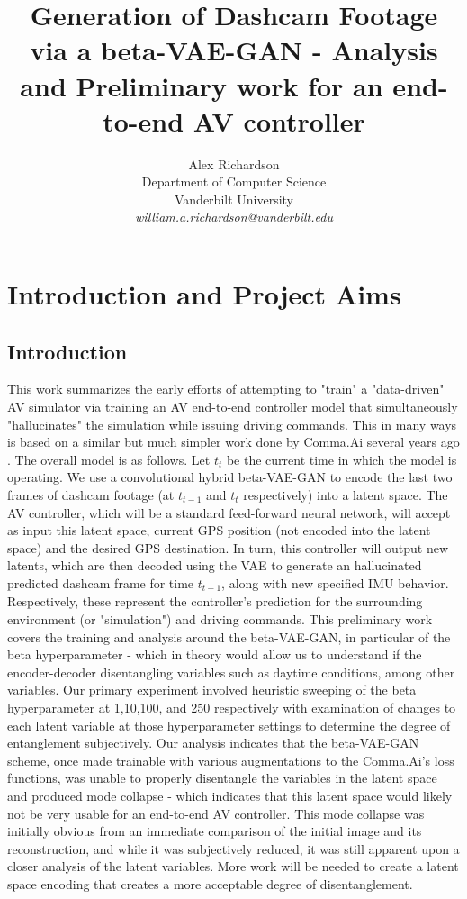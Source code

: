 \documentclass{article}
\title{Generation of Dashcam Footage via a beta-VAE-GAN - Analysis and Preliminary work for an end-to-end AV controller}
\author{
Alex Richardson \\
  Department of Computer Science\\
  Vanderbilt University\\
  \textit{william.a.richardson@vanderbilt.edu}
}
\begin{document}
\maketitle

\section{Introduction and Project Aims}
\subsection{Introduction}
 This work summarizes the early efforts of attempting to "train" a "data-driven" AV simulator via training an AV end-to-end controller model that simultaneously "hallucinates" the simulation while issuing driving commands. This in many ways is based on a similar but much simpler work done by Comma.Ai several years ago \cite{santana2016learning}. The overall model is as follows. Let $t_{t}$ be the current time in which the model is operating. We use a convolutional hybrid beta-VAE-GAN to encode the last two frames of dashcam footage (at $t_{t - 1}$ and $t_{t}$ respectively) into a latent space. The AV controller, which will be a standard feed-forward neural network, will accept as input this latent space, current GPS position (not encoded into the latent space) and the desired GPS destination. In turn, this controller will output new latents, which are then decoded using the VAE to generate an hallucinated predicted dashcam frame for time $t_{t + 1}$, along with new specified IMU behavior. Respectively, these represent the controller's prediction for the surrounding environment (or "simulation") and driving commands. This preliminary work covers the training and analysis around the beta-VAE-GAN, in particular of the beta hyperparameter - which in theory would allow us to understand if the encoder-decoder disentangling variables such as daytime conditions, among other variables. Our primary experiment involved heuristic sweeping of the beta hyperparameter at 1,10,100, and 250 respectively with examination of changes to each latent variable at those hyperparameter settings to determine the degree of entanglement subjectively. Our analysis indicates that the beta-VAE-GAN scheme, once made trainable with various augmentations to the Comma.Ai's loss functions, was unable to properly disentangle the variables in the latent space and produced mode collapse - which indicates that this latent space would likely not be very usable for an end-to-end AV controller. This mode collapse was initially obvious from an immediate comparison of the initial image and its reconstruction, and while it was subjectively reduced, it was still apparent upon a closer analysis of the latent variables. More work will be needed to create a latent space encoding that creates a more acceptable degree of disentanglement.
\end{document}
